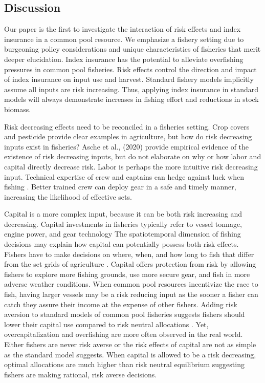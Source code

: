 \documentclass[
  super,
  preprint,
  3p]{elsarticle}
\theoremstyle{plain}
\theoremstyle{plain}
\theoremstyle{remark}
\begin{document}
\hypertarget{sec-disc}{%
\subsection{Discussion}\label{sec-disc}}

Our paper is the first to investigate the interaction of risk effects
and index insurance in a common pool resource. We emphasize a fishery
setting due to burgeoning policy considerations and unique
characteristics of fisheries that merit deeper elucidation. Index
insurance has the potential to alleviate overfishing pressures in common
pool fisheries. Risk effects control the direction and impact of index
insurance on input use and harvest. Standard fishery models implicitly
assume all inputs are risk increasing. Thus, applying index insurance in
standard models will always demonstrate increases in fishing effort and
reductions in stock biomass.

Risk decreasing effects need to be reconciled in a fisheries setting.
Crop covers and pesticide provide clear examples in agriculture, but how
do risk decreasing inputs exist in fisheries? Asche et al., (2020)
provide empirical evidence of the existence of risk decreasing inputs,
but do not elaborate on why or how labor and capital directly decrease
risk. Labor is perhaps the more intuitive risk decreasing input.
Technical expertise of crew and captains can hedge against luck when
fishing \citep{Alvarez2006}. Better trained crew can deploy gear in a
safe and timely manner, increasing the likelihood of effective sets.

Capital is a more complex input, because it can be both risk increasing
and decreasing. Capital investments in fisheries typically refer to
vessel tonnage, engine power, and gear technology The spatiotemporal
dimension of fishing decisions may explain how capital can potentially
possess both risk effects. Fishers have to make decisions on where,
when, and how long to fish that differ from the set grids of agriculture
\citep{Reimer2017}. Capital offers protection from risk by allowing
fishers to explore more fishing grounds, use more secure gear, and fish
in more adverse weather conditions. When common pool resources
incentivize the race to fish, having larger vessels may be a risk
reducing input as the sooner a fisher can catch they assure their income
at the expense of other fishers. Adding risk aversion to standard models
of common pool fisheries suggests fishers should lower their capital use
compared to risk neutral allocations \citep{Tilman2018, gibbons1993}.
Yet, overcapitalization and overfishing are more often observed in the
real world. Either fishers are never risk averse or the risk effects of
capital are not as simple as the standard model suggests. When capital
is allowed to be a risk decreasing, optimal allocations are much higher
than risk neutral equilibrium suggesting fishers are making rational,
risk averse decisions.
\end{document}
